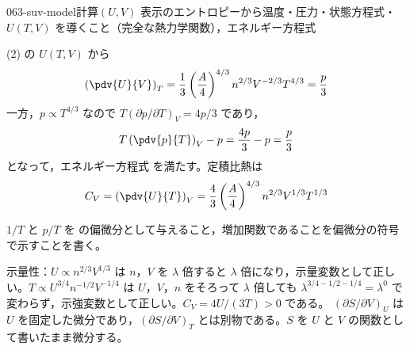 \documentclass[uplatex,dvipdfmx,a4paper,11pt]{jsarticle}
\begin{document}
\begin{mondai}{063-suv-model}{計算}{$(U,V)$ 表示のエントロピーから温度・圧力・状態方程式・$U(T,V)$ を導くこと（完全な熱力学関数），エネルギー方程式}
\begin{tadashii}
 (2) の $U(T,V)$ から
\[ \left(\pdv{U}{V}\right)_{T} = \frac{1}{3}\left(\frac{A}{4}\right)^{4/3}n^{2/3}V^{-2/3}T^{4/3} = \frac{p}{3} \]
一方，$p \propto T^{4/3}$ なので $T(\partial p/\partial T)_{V} = 4p/3$ であり，
\[ T\left(\pdv{p}{T}\right)_{V} - p = \frac{4p}{3} - p = \frac{p}{3} \]
となって，エネルギー方程式  を満たす。定積比熱は
\[ C_{V} = \left(\pdv{U}{T}\right)_{V} = \frac{4}{3}\left(\frac{A}{4}\right)^{4/3}n^{2/3}V^{1/3}T^{1/3} \]
\begin{ronten}
  \item {} $1/T$ と $p/T$ を  の偏微分として与えること，増加関数であることを偏微分の符号で示すことを書く。
\end{ronten}
\kenzan 示量性：$U \propto n^{2/3}V^{1/3}$ は $n$，$V$ を $\lambda$ 倍すると $\lambda$ 倍になり，示量変数として正しい。$T \propto U^{3/4}n^{-1/2}V^{-1/4}$ は $U$，$V$，$n$ をそろって $\lambda$ 倍しても $\lambda^{3/4 - 1/2 - 1/4} = \lambda^{0}$ で変わらず，示強変数として正しい。$C_{V} = 4U/(3T) > 0$ である。
\tsumazuki $(\partial S/\partial V)_{U}$ は $U$ を固定した微分であり，$(\partial S/\partial V)_{T}$ とは別物である。$S$ を $U$ と $V$ の関数として書いたまま微分する。
\end{tadashii}
\end{mondai}
\end{document}
